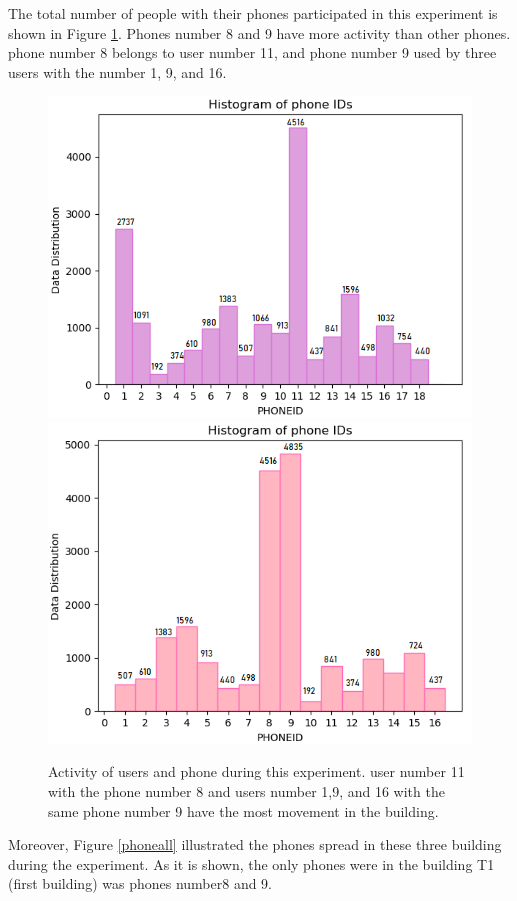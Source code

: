 The total number of people with their phones participated in this experiment is shown in Figure \ref{userphone}. Phones number 8 and 9 have more activity than other phones. phone number 8 belongs to user number 11, and phone number 9 used by three users with the number 1, 9, and 16.

\begin{figure}[!h]
    \centering
    \includegraphics[width=.5\textwidth]{image/Chapters/Chapter6/userID_data.png}\hfill
    \includegraphics[width=.5\textwidth]{image/Chapters/Chapter6/phoneID_data.png}
    \\[\smallskipamount]    
    \caption{Activity of users and phone during this experiment. user number 11 with the phone number 8 and users number 1,9, and 16 with the same phone number 9 have the most movement in the building.}
    \label{userphone}
\end{figure}


Moreover, Figure \ref{phoneall} illustrated the phones spread in these three building during the experiment. As it is shown, the only phones were in the building T1 (first building) was phones number8 and 9. 



